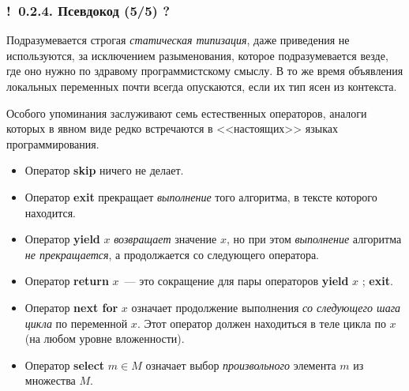 \documentclass[mathserif,12pt,aspectratio=169]{beamer}
\def\emразделенной{\em разделенной}
\def\em#1{\it\color{blue}#1}
\def\Ok{{\color{green}\textbf{!}\ }}
\def\Qm{{\color{brown}\textbf{?}\ }}
\begin{document}
\begin{frame}
\frametitle{\Ok 0.2.4. Псевдокод (5/5) \Qm}
\begin{remark}
Подразумевается строгая {\em статическая  типизация}, даже приведения не
используются, за исключением разыменования, которое
подразумевается везде, где оно нужно по здравому программистскому
смыслу.
В то же время объявления локальных переменных почти всегда
опускаются, если их тип ясен из контекста.
 \end{remark}
 
\smallskip
Особого упоминания заслуживают семь естественных операторов, аналоги
которых в явном виде редко встречаются в <<настоящих>> языках
программирования.

\begin{itemize}
\item Оператор \textbf{skip} ничего не делает. 
\item Оператор \textbf{exit} прекращает {\em выполнение} того алгоритма,
в тексте которого находится. 
\item Оператор \textbf{yield} $x$ {\em возвращает} значение $x$, но при этом 
{\em выполнение} алгоритма {\em не прекращается\/}, а продолжается со следующего оператора. 
\item Оператор \textbf{return} $x$~--- это сокращение 
для пары операторов \textbf{yield} $x$ ; \textbf{exit}. 
\item Оператор \textbf{next for} $x$ означает 
продолжение выполнения {\em со следующего шага цикла} по переменной $x$.
Этот оператор должен находиться в теле цикла по $x$ (на любом
уровне вложенности). 
\item Оператор \textbf{select} $m\!\in\!M$ 
означает выбор {\em произвольного} элемента $m$ из множества $M$. 
\end{itemize}

\end{frame}

\end{document}
